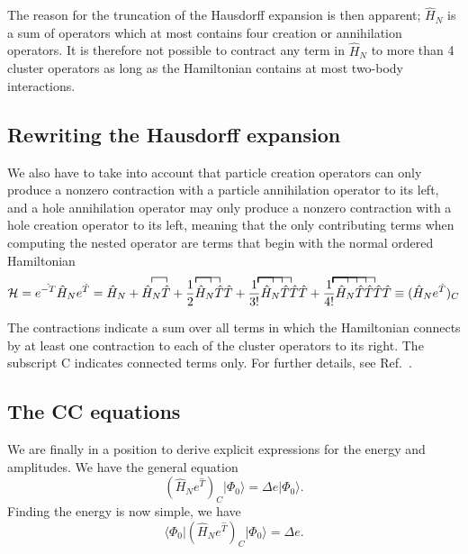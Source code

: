The reason for the truncation of the Hausdorff expansion is then
apparent; $\hat{H}_N$ is a sum of operators which at most contains
four creation or annihilation operators. It is therefore not possible
to contract any term in $\hat{H}_N$ to more than 4 cluster operators
as long as the Hamiltonian contains at most two-body interactions.

\subsection{Rewriting the Hausdorff expansion}

We also have to take into account that particle creation operators can
only produce a nonzero contraction with a particle annihilation
operator to its left, and a hole annihilation operator may only
produce a nonzero contraction with a hole creation operator to its
left, meaning that the only contributing terms when computing the nested
operator are terms that begin with the normal ordered Hamiltonian
\begin{equation}
\mathcal{H} = e^{\hat{-T}} \hat{H}_N e^{\hat{T}} = 
\hat{H}_N + 
\contraction{}{\hat{H}_N}{}{\hat{T}}
\hat{H}_N \hat{T} + 
\contraction{}{\hat{H}_N}{}{\hat{T}}
\contraction{}{\hat{H}_N}{\hat{T}}{\hat{T}}
\frac{1}{2} \hat{H}_N \hat{T} \hat{T} +
\contraction{}{\hat{H}_N}{}{\hat{T}}
\contraction{}{\hat{H}_N}{\hat{T}}{\hat{T}}
\contraction{}{\hat{H}_N}{\hat{T} \hat{T} }{\hat{T}}
\frac{1}{3!} \hat{H}_N \hat{T} \hat{T} \hat{T}  +
\contraction{}{\hat{H}_N}{}{\hat{T}}
\contraction{}{\hat{H}_N}{\hat{T}}{\hat{T}}
\contraction{}{\hat{H}_N}{\hat{T} \hat{T} }{\hat{T}}
\contraction{}{\hat{H}_N}{\hat{T} \hat{T} \hat{T} }{\hat{T}}
\frac{1}{4!} \hat{H}_N \hat{T} \hat{T} \hat{T} \hat{T} \equiv
(\hat{H}_Ne^{\hat{T}})_C
\label{eqn:hausdorff2}
\end{equation}

The contractions indicate a sum over all terms in which the
Hamiltonian connects by at least one contraction to each of the cluster
operators to its right. The subscript C indicates connected
terms only. For further details, see Ref.~\cite[p.294]{ShavittBartlett2009}.

\subsection{The CC equations}

We are finally in a position to derive explicit expressions for the energy and amplitudes.
We have the general equation 
\begin{equation}
(\hat{H}_Ne^{\hat{T}})_C \vert \Phi_0 \rangle = \Delta e \vert \Phi_0 \rangle.
\end{equation}
Finding the energy is now simple, we have
\begin{equation}
\langle \Phi_0 \vert (\hat{H}_Ne^{\hat{T}})_C \vert \Phi_0 \rangle = \Delta e  .
\label{eqn:ccm1}
\end{equation}

